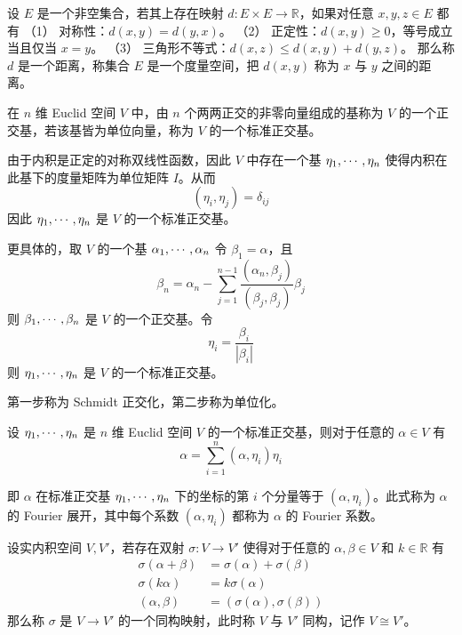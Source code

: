 \begin{definition}
	设 $E$ 是一个非空集合，若其上存在映射 $d : E \times E \to \mathbb{R}$，如果对任意 $x,y,z\in E$ 都有
	（1） 对称性：$d(x,y) = d(y,x)$。
	（2） 正定性：$d(x,y) \geqslant $0，等号成立当且仅当 $x = y$。
	（3） 三角形不等式：$d(x,z) \leqslant d(x,y) + d(y,z)$。
	那么称 $d$ 是一个距离，称集合 $E$ 是一个度量空间，把 $d(x,y)$ 称为 $x$ 与 $y$ 之间的距离。
\end{definition}

\begin{definition}
	在 $n$ 维 Euclid 空间 $V$ 中，由 $n$ 个两两正交的非零向量组成的基称为 $V$ 的一个正交基，若该基皆为单位向量，称为 $V$ 的一个标准正交基。
\end{definition}

由于内积是正定的对称双线性函数，因此 $V$ 中存在一个基 $\eta_1,\cdots,\eta_n$ 使得内积在此基下的度量矩阵为单位矩阵 $I$。从而
\[ (\eta_i,\eta_j) = \delta_{ij} \]
因此 $\eta_1,\cdots,\eta_n$ 是 $V$ 的一个标准正交基。

更具体的，取 $V$ 的一个基 $\alpha_1,\cdots,\alpha_n$ 令 $\beta_1 = \alpha$，且
\[ \beta_n = \alpha_n - \sum_{j=1}^{n-1} \frac{(\alpha_n,\beta_j)}{(\beta_j,\beta_j)} \beta_j \]
则 $\beta_1,\cdots,\beta_n$ 是 $V$ 的一个正交基。令
\[ \eta_i = \frac{\beta_i}{|\beta_i|} \]
则 $\eta_1,\cdots,\eta_n$ 是 $V$ 的一个标准正交基。

第一步称为 Schmidt 正交化，第二步称为单位化。

\begin{theorem}
	设 $\eta_1,\cdots,\eta_n$ 是 $n$ 维 Euclid 空间 $V$ 的一个标准正交基，则对于任意的 $\alpha \in V$ 有
	\[ \alpha = \sum_{i=1}^n (\alpha,\eta_i)\eta_i \]
\end{theorem}

即 $\alpha$ 在标准正交基 $\eta_1,\cdots,\eta_n$ 下的坐标的第 $i$ 个分量等于 $(\alpha,\eta_i)$。此式称为 $\alpha$ 的 Fourier 展开，其中每个系数 $(\alpha,\eta_i)$ 都称为 $\alpha$ 的 Fourier 系数。

\begin{definition}
	设实内积空间 $V,V'$，若存在双射 $\sigma : V \to V'$ 使得对于任意的 $\alpha,\beta \in V$ 和 $k \in \mathbb{R}$ 有
	\[
		\begin{aligned}
			\sigma(\alpha + \beta) & = \sigma(\alpha) + \sigma(\beta)  \\
			\sigma(k\alpha)        & = k\sigma(\alpha)                 \\
			(\alpha,\beta)         & = (\sigma(\alpha),\sigma(\beta))
		\end{aligned}
	\]
	那么称 $\sigma$ 是 $V \to V'$ 的一个同构映射，此时称 $V$ 与 $V'$ 同构，记作 $V \cong V'$。
\end{definition}

